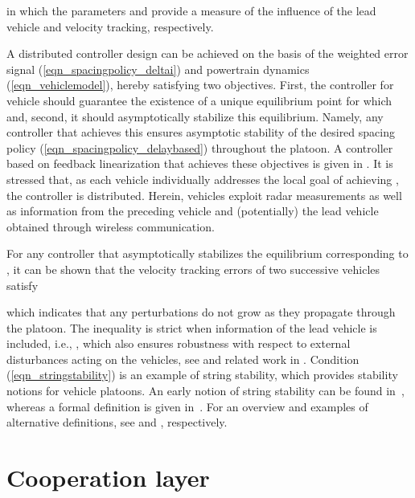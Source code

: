 \documentclass[journal]{IEEEtran}
\begin{document}
in which the parameters  and  provide a measure of the influence of the lead vehicle and velocity tracking, respectively.

A distributed controller design can be achieved on the basis of the weighted error signal (\ref{eqn_spacingpolicy_deltai}) and powertrain dynamics (\ref{eqn_vehiclemodel}), hereby satisfying two objectives. First, the controller for vehicle  should guarantee the existence of a unique equilibrium point for which  and, second, it should asymptotically stabilize this equilibrium. Namely, any controller that achieves this ensures asymptotic stability of the desired spacing policy (\ref{eqn_spacingpolicy_delaybased}) throughout the platoon. A controller based on feedback linearization that achieves these objectives is given in \cite{besselink_2015b}. It is stressed that, as each vehicle individually addresses the local goal of achieving , the controller is distributed. Herein, vehicles exploit radar measurements as well as information from the preceding vehicle and (potentially) the lead vehicle obtained through wireless communication.

For any controller that asymptotically stabilizes the equilibrium corresponding to , it can be shown that the velocity tracking errors of two successive vehicles satisfy

which indicates that any perturbations do not grow as they propagate through the platoon. The inequality is strict when information of the lead vehicle is included, i.e., , which also ensures robustness with respect to external disturbances acting on the vehicles, see \cite{besselink_2015b} and related work in \cite{seiler_2004}. Condition (\ref{eqn_stringstability}) is an example of string stability, which provides stability notions for vehicle platoons. An early notion of string stability can be found in~\cite{peppard_1974}, whereas a formal definition is given in~\cite{swaroop_1996}. For an overview and examples of alternative definitions, see \cite{ploeg_2014} and \cite{fenton_1968,sheikholeslam_1993}, respectively.




\section{Cooperation layer}\label{sec_cooperationlayer}
\end{document}
